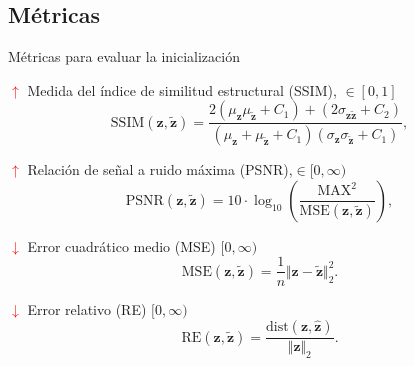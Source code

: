 \documentclass[aspectratio=169,t,xcolor=table]{beamer}
\begin{document}
\subsection{Métricas}
\begin{frame}{Métricas para evaluar la inicialización}
    \centering
    \scriptsize \vspace{-0.5cm}
    \begin{block}{\scriptsize {\small \textcolor{red}{$\uparrow$}} Medida del índice de similitud estructural (SSIM), $ \in [0,1]$ }
    \begin{equation*}
        \mathrm{SSIM}(\mathbf{z}, \tilde{\mathbf{z}}) = \frac{2(\mu_{\mathbf{z}}\mu_{\tilde{\mathbf{z}}} + C_1) + (2\sigma_{\mathbf{z}\tilde{\mathbf{z}}} + C_2)}{(\mu_{\mathbf{z}} + \mu_{\tilde{\mathbf{z}}} + C_1)(\sigma_{\mathbf{z}}\sigma_{\tilde{\mathbf{z}}} + C_1)},
        \label{eq:SSIM}
    \end{equation*}
    \end{block}
    \begin{block}{\scriptsize {\small \textcolor{red}{$\uparrow$}} Relación de señal a ruido máxima (PSNR),$ \in [0,\infty)$}
    \begin{equation*}
        \mathrm{PSNR}(\mathbf{z}, \tilde{\mathbf{z}})=10 \cdot \log_{10}\left(\frac{\mathrm{MAX}^{2}}{\mathrm{MSE}(\mathbf{z}, \tilde{\mathbf{z}})}\right),
        \label{eq:PSNR}
    \end{equation*}
    \end{block}
    \begin{block}{\scriptsize {\small \textcolor{red}{$\downarrow$}} Error cuadrático medio (MSE) $[0,\infty)$}
    \begin{equation*}
        \mathrm{MSE}(\mathbf{z}, \tilde{\mathbf{z}}) = \frac{1}{n} \Vert \mathbf{z} - \tilde{\mathbf{z}}\Vert_2^2.
        \label{eq:MSE}
    \end{equation*}
    \end{block}
    \begin{block}{\scriptsize {\small \textcolor{red}{$\downarrow$}} Error relativo (RE) $[0,\infty)$}
        \begin{equation*}
            \mathrm{RE}(\mathbf{z}, \tilde{\mathbf{z}}) = \frac{ \mathrm{dist}(\mathbf{z}, \hat{\mathbf{z}})}{\Vert \mathbf{z} \Vert_2}.
            \label{eq:RE}
        \end{equation*}
    \end{block}

\end{frame}
\end{document}
